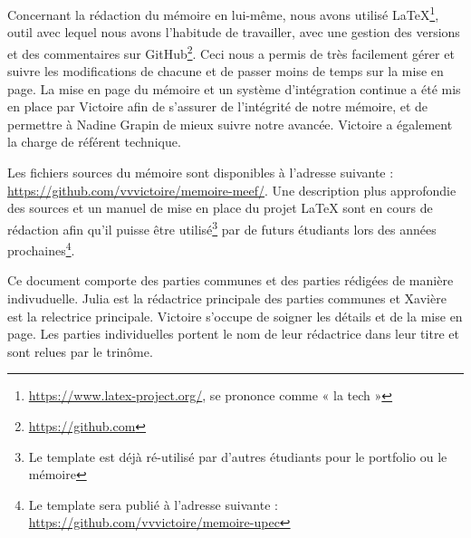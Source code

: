 Concernant la rédaction du mémoire en lui-même, nous avons utilisé \LaTeX\footnote{\url{https://www.latex-project.org/}, se prononce comme « la tech »},
outil avec lequel nous avons l’habitude de travailler, avec une gestion des versions et des commentaires sur GitHub\footnote{\url{https://github.com}}. Ceci nous a permis de très facilement gérer et suivre les modifications de chacune et de passer moins de temps sur la mise en page. La mise en page du mémoire et un système d'intégration continue a été mis en place par Victoire afin de s'assurer de l'intégrité de notre mémoire, et de permettre à Nadine Grapin de mieux suivre notre avancée. Victoire a également la charge de référent technique.

Les fichiers sources du mémoire sont disponibles à l'adresse suivante : \url{https://github.com/vvvictoire/memoire-meef/}. Une description plus approfondie des sources et un manuel de mise en place du projet \LaTeX{} sont en cours de rédaction afin qu'il puisse être utilisé\footnote{Le template est déjà ré-utilisé par d'autres étudiants pour le portfolio ou le mémoire} par de futurs étudiants lors des années prochaines\footnote{Le template sera publié à l'adresse
suivante : \url{https://github.com/vvvictoire/memoire-upec}}.

Ce document comporte des parties communes et des parties rédigées de manière indivuduelle. Julia est la rédactrice principale des parties communes et Xavière est la relectrice principale.
Victoire s'occupe de soigner les détails et de la mise en page. Les parties individuelles portent le nom de leur rédactrice dans leur titre et sont relues par le trinôme.
